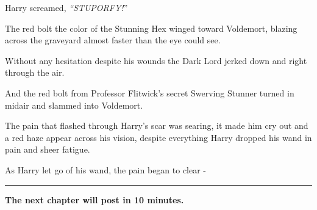 Harry screamed, \emph{``STUPORFY!}''

The red bolt the color of the Stunning Hex winged toward Voldemort, blazing across the graveyard almost faster than the eye could see.

Without any hesitation despite his wounds the Dark Lord jerked down and right through the air.

And the red bolt from Professor Flitwick's secret Swerving Stunner turned in midair and slammed into Voldemort.

The pain that flashed through Harry's scar was searing, it made him cry out and a red haze appear across his vision, despite everything Harry dropped his wand in pain and sheer fatigue.

As Harry let go of his wand, the pain began to clear -

\begin{center}\rule{3in}{0.4pt}\end{center}

\textbf{The next chapter will post in 10 minutes.}
